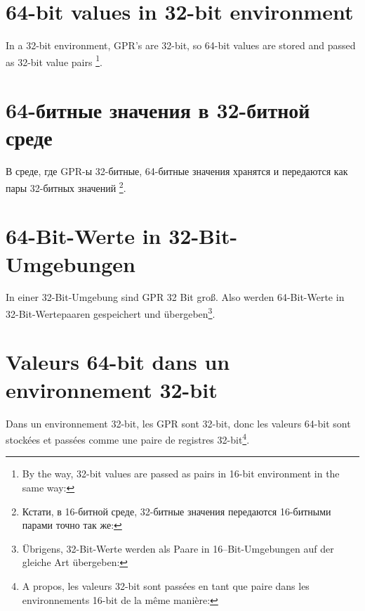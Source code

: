\ifdefined\ENGLISH
\section{64-bit values in 32-bit environment}
\label{sec:64bit_in_32_env}

In a 32-bit environment, \ac{GPR}'s are 32-bit, so 64-bit values are stored and passed as 32-bit value pairs
\footnote{By the way, 32-bit values are passed as pairs in 16-bit environment in the same way: }.
\fi

\ifdefined\RUSSIAN
\section{64-битные значения в 32-битной среде}
\label{sec:64bit_in_32_env}

В среде, где \ac{GPR}-ы 32-битные, 64-битные значения хранятся и передаются как пары 32-битных значений
\footnote{Кстати, в 16-битной среде, 32-битные значения передаются 16-битными парами точно так же: }.
\fi

\ifdefined\GERMAN
\section{64-Bit-Werte in 32-Bit-Umgebungen}
\label{sec:64bit_in_32_env}

In einer 32-Bit-Umgebung sind \ac{GPR} 32 Bit groß. Also werden 64-Bit-Werte in
32-Bit-Wertepaaren gespeichert und übergeben\footnote{Übrigens, 32-Bit-Werte werden
als Paare in 16--Bit-Umgebungen auf der gleiche Art übergeben: }.
\fi

\ifdefined\FRENCH
\section{Valeurs 64-bit dans un environnement 32-bit}
\label{sec:64bit_in_32_env}

Dans un environnement 32-bit, les \ac{GPR} sont 32-bit, donc les valeurs 64-bit sont
stockées et passées comme une paire de registres 32-bit\footnote{A propos, les valeurs
32-bit sont passées en tant que paire dans les environnements 16-bit de la même manière:
}.
\fi







